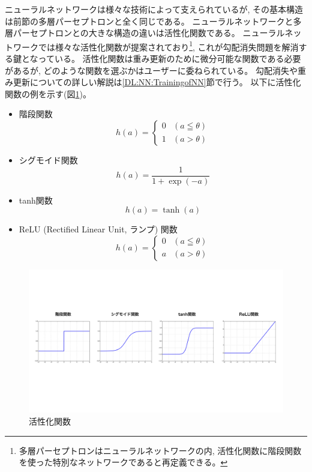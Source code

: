 ニューラルネットワークは様々な技術によって支えられているが, その基本構造は前節の多層パーセプトロンと全く同じである。
ニューラルネットワークと多層パーセプトロンとの大きな構造の違いは活性化関数である。
ニューラルネットワークでは様々な活性化関数が提案されており\footnote{多層パーセプトロンはニューラルネットワークの内, 活性化関数に階段関数を使った特別なネットワークであると再定義できる。}, これが勾配消失問題を解消する鍵となっている。
活性化関数は重み更新のために微分可能な関数である必要があるが, どのような関数を選ぶかはユーザーに委ねられている。
勾配消失や重み更新についての詳しい解説は\ref{DL:NN:TrainingofNN}節で行う。
以下に活性化関数の例を示す(図\ref{5ActivationFunction})。
\begin{itemize}
  \item 階段関数
\begin{equation}
 h(a) = \left\{ \begin{array}{ll}
    0 & (a \leqq \theta) \\
    1 & (a > \theta)
 \end{array} \right.
\end{equation}
  \item シグモイド関数
\begin{equation}
 h(a) = \frac{1}{1+\exp{(-a)}}
\end{equation}
  \item tanh関数
\begin{equation}
 h(a) = \tanh{(a)}
\end{equation}
  \item ReLU (Rectified Linear Unit, ランプ) 関数~\cite{ReLUpaper}
\begin{equation}
 h(a) = \left\{ \begin{array}{ll}
    0 & (a \leqq \theta) \\
    a & (a > \theta)
 \end{array} \right.
\end{equation}
\end{itemize}

\begin{figure}[htbp]
 \centering
 \includegraphics[trim = 0 250 0 250, width=1.0\textwidth, clip]{Figure/2DeepLearning/5ActivationFunction.png}
 \caption{活性化関数}
 \label{5ActivationFunction}
\end{figure}

